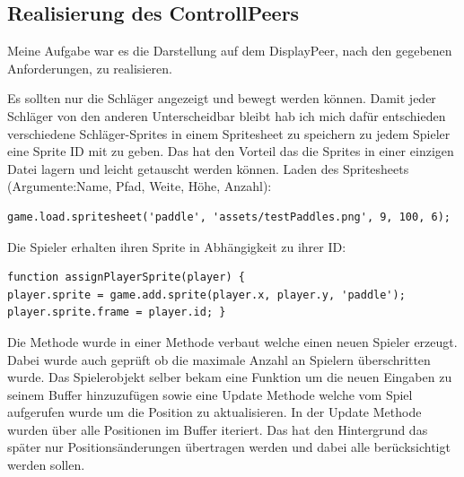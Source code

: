 \subsection{Realisierung des ControllPeers}
Meine Aufgabe war es die Darstellung auf dem DisplayPeer, nach den gegebenen Anforderungen, zu realisieren.

Es sollten nur die Schläger angezeigt und bewegt werden können. Damit jeder Schläger von den anderen Unterscheidbar bleibt hab ich mich dafür entschieden verschiedene Schläger-Sprites in einem Spritesheet zu speichern zu jedem Spieler eine Sprite ID mit zu geben.
Das hat den Vorteil das die Sprites in einer einzigen Datei lagern und leicht getauscht werden können.
\newline
Laden des Spritesheets (Argumente:Name, Pfad, Weite, Höhe, Anzahl):
\begin{lstlisting}
game.load.spritesheet('paddle', 'assets/testPaddles.png', 9, 100, 6);
\end{lstlisting}
Die Spieler erhalten ihren Sprite in Abhängigkeit zu ihrer ID:
\begin{lstlisting}
function assignPlayerSprite(player) {
player.sprite = game.add.sprite(player.x, player.y, 'paddle');
player.sprite.frame = player.id; }
\end{lstlisting}
Die Methode wurde in einer Methode verbaut welche einen neuen Spieler erzeugt. Dabei wurde auch geprüft ob die maximale Anzahl an Spielern überschritten wurde.
\newline
Das Spielerobjekt selber bekam eine Funktion um die neuen Eingaben zu seinem Buffer hinzuzufügen sowie eine Update Methode welche vom Spiel aufgerufen wurde um die Position zu aktualisieren.
\newline
In der Update Methode wurden über alle Positionen im Buffer iteriert. Das hat den Hintergrund das später nur Positionsänderungen übertragen werden und dabei alle berücksichtigt werden sollen.
